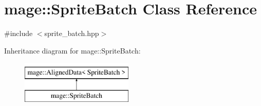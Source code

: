 \hypertarget{classmage_1_1_sprite_batch}{}\section{mage\+:\+:Sprite\+Batch Class Reference}
\label{classmage_1_1_sprite_batch}


{\ttfamily \#include $<$sprite\+\_\+batch.\+hpp$>$}

Inheritance diagram for mage\+:\+:Sprite\+Batch\+:\begin{figure}[H]
\begin{center}
\leavevmode
\includegraphics[height=2.000000cm]{classmage_1_1_sprite_batch}
\end{center}
\end{figure}
